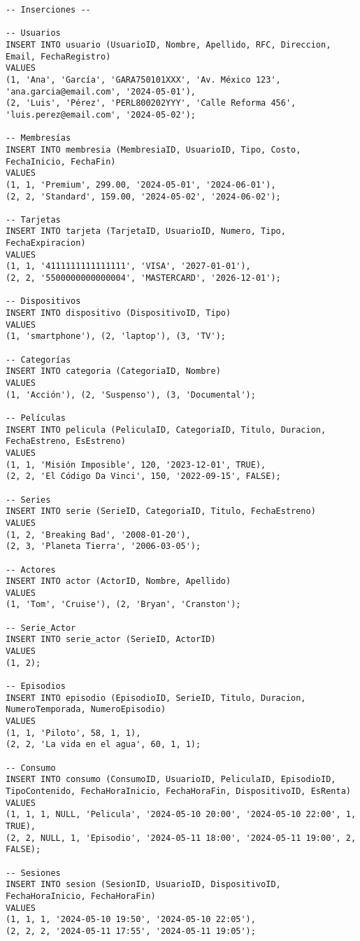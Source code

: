 \documentclass[12pt,a4paper]{article}
\begin{document}
\begin{lstlisting}
-- Inserciones --

-- Usuarios
INSERT INTO usuario (UsuarioID, Nombre, Apellido, RFC, Direccion, Email, FechaRegistro)
VALUES
(1, 'Ana', 'García', 'GARA750101XXX', 'Av. México 123', 'ana.garcia@email.com', '2024-05-01'),
(2, 'Luis', 'Pérez', 'PERL800202YYY', 'Calle Reforma 456', 'luis.perez@email.com', '2024-05-02');

-- Membresías
INSERT INTO membresia (MembresiaID, UsuarioID, Tipo, Costo, FechaInicio, FechaFin)
VALUES
(1, 1, 'Premium', 299.00, '2024-05-01', '2024-06-01'),
(2, 2, 'Standard', 159.00, '2024-05-02', '2024-06-02');

-- Tarjetas
INSERT INTO tarjeta (TarjetaID, UsuarioID, Numero, Tipo, FechaExpiracion)
VALUES
(1, 1, '4111111111111111', 'VISA', '2027-01-01'),
(2, 2, '5500000000000004', 'MASTERCARD', '2026-12-01');

-- Dispositivos
INSERT INTO dispositivo (DispositivoID, Tipo)
VALUES
(1, 'smartphone'), (2, 'laptop'), (3, 'TV');

-- Categorías
INSERT INTO categoria (CategoriaID, Nombre)
VALUES
(1, 'Acción'), (2, 'Suspenso'), (3, 'Documental');

-- Películas
INSERT INTO pelicula (PeliculaID, CategoriaID, Titulo, Duracion, FechaEstreno, EsEstreno)
VALUES
(1, 1, 'Misión Imposible', 120, '2023-12-01', TRUE),
(2, 2, 'El Código Da Vinci', 150, '2022-09-15', FALSE);

-- Series
INSERT INTO serie (SerieID, CategoriaID, Titulo, FechaEstreno)
VALUES
(1, 2, 'Breaking Bad', '2008-01-20'),
(2, 3, 'Planeta Tierra', '2006-03-05');

-- Actores
INSERT INTO actor (ActorID, Nombre, Apellido)
VALUES
(1, 'Tom', 'Cruise'), (2, 'Bryan', 'Cranston');

-- Serie_Actor
INSERT INTO serie_actor (SerieID, ActorID)
VALUES
(1, 2);

-- Episodios
INSERT INTO episodio (EpisodioID, SerieID, Titulo, Duracion, NumeroTemporada, NumeroEpisodio)
VALUES
(1, 1, 'Piloto', 58, 1, 1),
(2, 2, 'La vida en el agua', 60, 1, 1);

-- Consumo
INSERT INTO consumo (ConsumoID, UsuarioID, PeliculaID, EpisodioID, TipoContenido, FechaHoraInicio, FechaHoraFin, DispositivoID, EsRenta)
VALUES
(1, 1, 1, NULL, 'Pelicula', '2024-05-10 20:00', '2024-05-10 22:00', 1, TRUE),
(2, 2, NULL, 1, 'Episodio', '2024-05-11 18:00', '2024-05-11 19:00', 2, FALSE);

-- Sesiones
INSERT INTO sesion (SesionID, UsuarioID, DispositivoID, FechaHoraInicio, FechaHoraFin)
VALUES
(1, 1, 1, '2024-05-10 19:50', '2024-05-10 22:05'),
(2, 2, 2, '2024-05-11 17:55', '2024-05-11 19:05');


\end{lstlisting}
\end{document}
